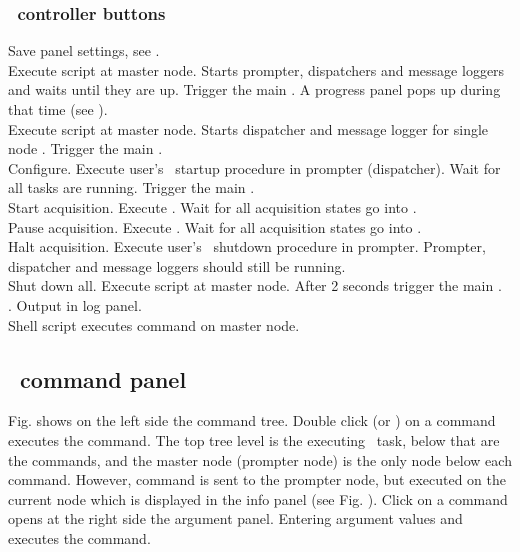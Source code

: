 \subsubsection[MBS controller buttons]{\mbs\  controller buttons}
 Save panel settings, see .\\
  Execute script  at master node.
Starts prompter, dispatchers and message loggers and waits until they are up.
Trigger the main .
A progress panel pops up during that time (see ).\\
 Execute script  at master node.
Starts dispatcher and message logger for single node \mbs.
Trigger the main .\\
 Configure. Execute user's \mbs\ startup procedure in prompter (dispatcher).
Wait for all  tasks are running. Trigger the main .\\
 Start acquisition. Execute . Wait for all
acquisition states go into .\\
 Pause acquisition. Execute . Wait for all
acquisition states go into .\\
 Halt acquisition. Execute user's \mbs\ shutdown procedure in prompter.
Prompter, dispatcher and message loggers should still be running.\\
 Shut down all. Execute script  at master node.
After 2 seconds trigger the main .\\
 . Output in log panel.\\
 Shell script executes command on master node.
\subsection[MBS command panel]{\mbs\ command panel}
Fig.  shows
on the left side the command tree. Double click (or ) on a command
executes the command. The top tree level is the executing \mbs\ task,
below that are the commands, and the master node (prompter node) is the only node
below each command. However,
command is sent to the prompter node, but executed on the current node 
which is displayed in the info panel
(see Fig. ).
Click on a command opens at the right side the argument panel.
Entering argument values and  executes the command.

